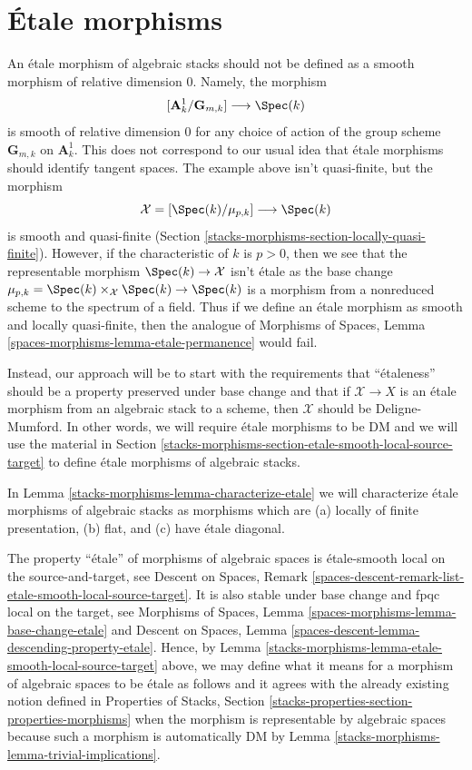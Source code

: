 \section{\'Etale morphisms}
\label{stacks-morphisms-section-etale}
An \'etale morphism of algebraic stacks should not be defined as a
smooth morphism of relative dimension $0$. Namely, the morphism
$$
[\mathbf{A}^1_k/\mathbf{G}_{m, k}] \longrightarrow \Spec(k)
$$
is smooth of relative dimension $0$ for any choice of action
of the group scheme $\mathbf{G}_{m, k}$ on $\mathbf{A}^1_k$.
This does not correspond to our usual idea that \'etale morphisms
should identify tangent spaces. The example above isn't quasi-finite,
but the morphism
$$
\mathcal{X} = [\Spec(k)/\mu_{p, k}] \longrightarrow \Spec(k)
$$
is smooth and quasi-finite (Section \ref{stacks-morphisms-section-locally-quasi-finite}).
However, if the characteristic of $k$ is $p > 0$, then we see
that the representable morphism $\Spec(k) \to \mathcal{X}$
isn't \'etale as the base change
$\mu_{p, k} = \Spec(k) \times_\mathcal{X} \Spec(k) \to \Spec(k)$
is a morphism from a nonreduced scheme to the spectrum of a field.
Thus if we define an \'etale morphism as smooth and locally quasi-finite,
then the analogue of Morphisms of Spaces, Lemma
\ref{spaces-morphisms-lemma-etale-permanence} would fail.

\medskip\noindent
Instead, our approach will be to start with the requirements that
``\'etaleness'' should be a property preserved under base change and that if
$\mathcal{X} \to X$ is an \'etale morphism from an algebraic stack
to a scheme, then $\mathcal{X}$ should be Deligne-Mumford.
In other words, we will require \'etale morphisms to be DM and
we will use the material in
Section \ref{stacks-morphisms-section-etale-smooth-local-source-target} to define
\'etale morphisms of algebraic stacks.

\medskip\noindent
In Lemma \ref{stacks-morphisms-lemma-characterize-etale} we will characterize
\'etale morphisms of algebraic stacks as morphisms which are
(a) locally of finite presentation,
(b) flat, and (c) have \'etale diagonal.

\medskip\noindent
The property ``\'etale'' of morphisms of algebraic spaces
is \'etale-smooth local on the source-and-target, see
Descent on Spaces, Remark
\ref{spaces-descent-remark-list-etale-smooth-local-source-target}.
It is also stable under base change and fpqc local on the target, see
Morphisms of Spaces,
Lemma \ref{spaces-morphisms-lemma-base-change-etale}
and
Descent on Spaces,
Lemma \ref{spaces-descent-lemma-descending-property-etale}.
Hence, by
Lemma \ref{stacks-morphisms-lemma-etale-smooth-local-source-target}
above, we may define what it means for a morphism of algebraic spaces
to be \'etale as follows and it agrees with the already existing notion
defined in Properties of Stacks, Section
\ref{stacks-properties-section-properties-morphisms}
when the morphism is representable by algebraic spaces
because such a morphism is automatically DM by
Lemma \ref{stacks-morphisms-lemma-trivial-implications}.


